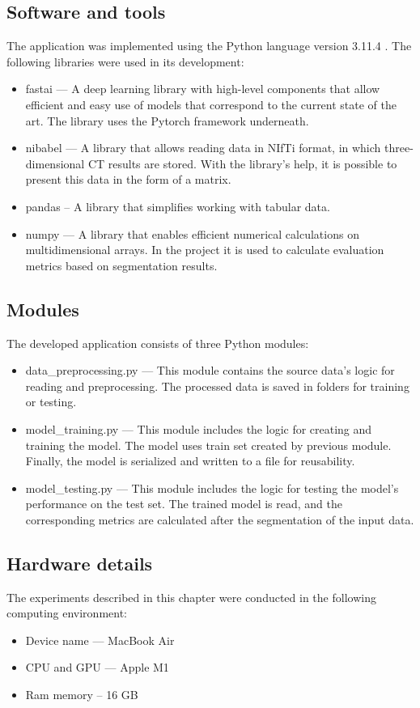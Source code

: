 \subsection{Software and tools}

The application was implemented using the Python language version 3.11.4 \cite{python}. The following libraries were used in its development:
\begin{itemize}
    \item fastai  \cite{howard2018fastai} --- A deep learning library with high-level components that allow efficient and easy use of models that correspond to the current state of the art. The library uses the Pytorch framework \cite{NEURIPS2019_9015}  underneath.
    \item nibabel \cite{brett_2024_10714563} --- A library that allows reading data in NIfTi format, in which three-dimensional CT results are stored. With the library's help, it is possible to present this data in the form of a matrix.
    \item pandas \cite{reback2020pandas} -- A library that simplifies working with tabular data. 
    \item numpy \cite{harris2020array} --- A library that enables efficient numerical calculations on multidimensional arrays. In the project it is used to calculate evaluation metrics based on segmentation results.
\end{itemize}

\subsection{Modules}
The developed application consists of three Python modules:
\begin{itemize}
    \item data\_preprocessing.py --- This module contains the source data's logic for reading and preprocessing. The processed data is saved in folders for training or testing. 
    \item model\_training.py --- This module includes the logic for creating and training the model. The model uses train set created by previous module. Finally, the model is serialized and written to a file for reusability.
    \item model\_testing.py --- This module includes the logic for testing the model's performance on the test set. The trained model is read, and the corresponding metrics are calculated after the segmentation of the input data.

\end{itemize}
\subsection{Hardware details}
The experiments described in this chapter were conducted in the following computing environment:
\begin{itemize}
    \item Device name --- MacBook Air
    \item CPU and GPU --- Apple M1
    \item Ram memory -- 16 GB
\end{itemize}




